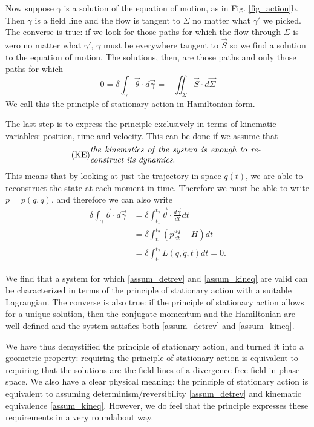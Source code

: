 \documentclass[fleqn,10pt]{wlscirep}
\begin{document}
Now suppose $\gamma$ is a solution of the equation of motion, as in Fig. \ref{fig_action}b. Then $\gamma$ is a field line and the flow is tangent to $\Sigma$ no matter what $\gamma'$ we picked. The converse is true: if we look for those paths for which the flow through $\Sigma$ is zero no matter what $\gamma'$, $\gamma$ must be everywhere tangent to $\vec{S}$ so we find a solution to the equation of motion. The solutions, then, are those paths and only those paths for which
\begin{equation}\label{sdof_stationary_action}
	0 =\delta \int_{\gamma} \vec{\theta} \cdot d\vec{\gamma} = - \iint_{\Sigma} \vec{S} \cdot d\vec{\Sigma} 
\end{equation}
We call this the principle of stationary action in Hamiltonian form.

The last step is to express the principle exclusively in terms of kinematic variables: position, time and velocity. This can be done if we assume that 
\begin{align}\label{assum_kineq}
	\tag*{(KE)}
	\parbox{2.8in}{\emph{the kinematics of the system is enough to reconstruct its dynamics}.}
\end{align}
This means that by looking at just the trajectory in space $q(t)$, we are able to reconstruct the state at each moment in time. Therefore we must be able to write $p=p(q,\dot{q})$, and therefore we can also write
\begin{equation}\label{sdof_Lagrangian}
	\begin{aligned}
		\delta \int_{\gamma} \vec{\theta} \cdot d\vec{\gamma} 
		&= \delta \int^{t_2}_{t_1} \vec{\theta} \cdot \frac{d\vec{\gamma}}{dt} dt \\  
		&= \delta \int^{t_2}_{t_1} \left(p \frac{dq}{dt} - H \right) dt \\
		&= \delta \int^{t_2}_{t_1}L(q, \dot{q}, t) dt = 0.
	\end{aligned}
\end{equation}

We find that a system for which \ref{assum_detrev} and \ref{assum_kineq} are valid can be characterized in terms of the principle of stationary action with a suitable Lagrangian. The converse is also true: if the principle of stationary action allows for a unique solution, then the conjugate momentum and the Hamiltonian are well defined and the system satisfies both \ref{assum_detrev} and \ref{assum_kineq}.

We have thus demystified the principle of stationary action, and turned it into a geometric property: requiring the principle of stationary action is equivalent to requiring that the solutions are the field lines of a divergence-free field in phase space. We also have a clear physical meaning: the principle of stationary action is equivalent to assuming determinism/reversibility \ref{assum_detrev} and kinematic equivalence \ref{assum_kineq}. However, we do feel that the principle expresses these requirements in a very roundabout way.
\end{document}
